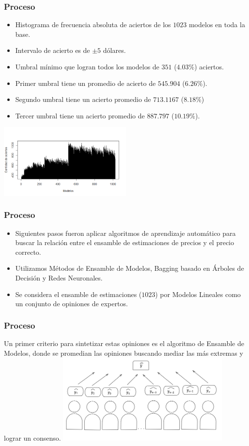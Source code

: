 \documentclass{beamer}
\begin{document}
\begin{frame}[t]
\frametitle{Proceso}
\vfill
\begin{itemize}
\item
Histograma de frecuencia absoluta de aciertos de los $1023$ modelos en toda la base.
\item
Intervalo de acierto es de $\pm 5$ dólares.
\item
Umbral mínimo que logran todos los modelos de $351$ ($4.03\%$) aciertos. 
\item
Primer umbral tiene un promedio de acierto de $545.904$ ($6.26\%$).
\item
Segundo umbral tiene un acierto promedio de $713.1167$ ($8.18\%$) 
\item
Tercer umbral tiene un acierto promedio de $887.797$ ($10.19\%$). 
\end{itemize}

\centering
\includegraphics[width=0.5\textwidth]{histograma}

\vfill
\end{frame}

\begin{frame}[t]
\frametitle{Proceso}
\vfill
\begin{itemize}
\item
Siguientes pasos fueron aplicar algoritmos de aprendizaje automático para buscar la relación entre el ensamble de estimaciones de precios y el precio correcto. 
\item
Utilizamos Métodos de Ensamble de Modelos, Bagging basado en Árboles de Decisión y Redes Neuronales.
\item
Se considera el ensamble de estimaciones ($1023$) por Modelos Lineales como un conjunto de opiniones de expertos.
\end{itemize}
\vfill
\end{frame}

\begin{frame}[t]
\frametitle{Proceso}
\vfill
Un primer criterio para sintetizar estas opiniones es el algoritmo de Ensamble de Modelos, donde se promedian las opiniones buscando mediar las  más extremas y lograr un consenso. 
\vfill
\centering
\includegraphics[width=0.65\textwidth]{diagramMeanExpertOpinion}


\end{frame}
\end{document}
